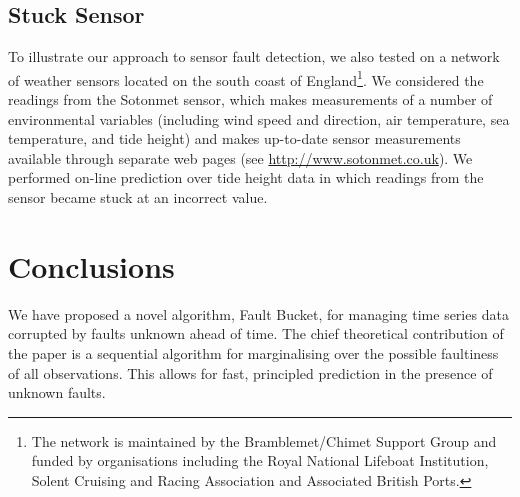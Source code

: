 \documentclass{article}
\begin{document}
\subsection{Stuck Sensor}
To illustrate our approach to sensor fault detection, we also tested on a network of weather sensors located on the south coast of England\footnote{The network is maintained by the Bramblemet/Chimet Support Group and funded by organisations including the Royal National Lifeboat Institution, Solent Cruising and Racing Association and Associated British Ports.}. We considered the readings from the Sotonmet sensor, which makes measurements of a number of environmental variables (including wind speed and direction, air temperature, sea temperature, and tide height) and makes up-to-date sensor measurements available through separate web pages (see \url{http://www.sotonmet.co.uk}). We performed on-line prediction over tide height data in which readings from the sensor became stuck at an incorrect value. 

\section{Conclusions}
We have proposed a novel algorithm, Fault Bucket, for managing time series data corrupted by faults unknown ahead of time. The chief theoretical contribution of the paper is a sequential algorithm for marginalising over the possible faultiness of all observations. This allows for fast, principled prediction in the presence of unknown faults.



\end{document}

